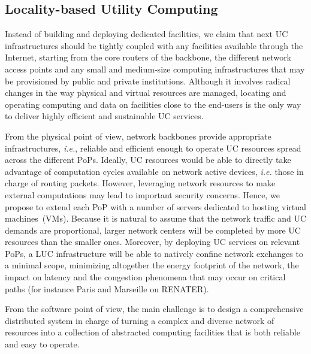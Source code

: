\documentclass[11pt,a4paper,twoside]{article}
\newcommand{\ie}{\textit{i.e.}\xspace}
\begin{document}

\subsection{Locality-based Utility Computing}

Instead of building and deploying dedicated facilities, we claim that next UC
infrastructures should be tightly coupled with any facilities available through
the Internet, starting from the core routers of the backbone, the different
network access points and any small and medium-size computing infrastructures
that may be provisioned by public and private institutions. 
 Although it involves radical changes in the way
physical and virtual resources are managed, locating and operating computing and data on
facilities close to the end-users is the only way to deliver highly efficient
and sustainable UC services. 

From the physical point of view, network backbones 
provide appropriate infrastructures, \ie, reliable and efficient enough to operate UC
resources spread across the different PoPs. Ideally, UC resources would be able to
directly take advantage of computation cycles available on network active devices,
\textit{i.e.} those in charge of routing packets. However, leveraging network resources to
make external computations may lead to important security concerns. Hence, we propose to
extend each PoP with a number of servers dedicated to hosting virtual machines~(VMs). Because it is natural
to assume that the network traffic and UC demands are proportional, larger network centers
will be completed by more UC resources than the smaller ones. Moreover, by deploying UC
services on relevant PoPs, a LUC infrastructure will be able to natively confine network
exchanges to a minimal scope, minimizing altogether the energy footprint of the network, the
impact on latency and the congestion phenomena that may occur on critical paths (for
instance Paris and Marseille on RENATER).

From the software point of view, the main challenge is to design a comprehensive distributed
system in charge of turning a complex and diverse network of resources into a collection
of abstracted computing facilities that is both reliable and easy to operate.

\end{document}
